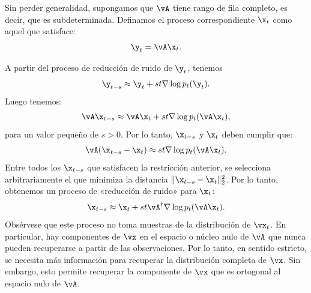 \documentclass[../../book-main_es.tex]{subfiles}
\begin{document}
Sin perder generalidad, supongamos que $\vA$ tiene rango de fila completo,
es decir, que es subdeterminada. Definamos el proceso correspondiente
$\x_t$ como aquel que satisface:
\begin{equation}
    \y_t = \vA \x_t.
\end{equation}

A partir del proceso de reducción de ruido de $\y_t$, tenemos
\begin{equation}
    \y_{t-s} \approx  \y_t + st \nabla \log p_t(\y_t).
\end{equation}
Luego tenemos:
\begin{equation}
    \vA\x_{t-s} \approx   \vA\x_t + st \nabla \log p_t(\vA \x_t),
\end{equation}
para un valor pequeño de $s > 0$. Por lo tanto, $\x_{t-s}$ y $\x_t$ deben cumplir que:
\begin{equation}
    \vA(\x_{t-s} - \x_t) \approx st \nabla \log p_t(\vA\x_t).
\end{equation}
Entre todos los $\x_{t-s}$ que satisfacen la restricción anterior,
se selecciona arbitrariamente el que minimiza la distancia $\|\x_{t-s} -
\x_t\|_2^2$. Por lo tanto, obtenemos un proceso de «reducción de ruido» para $\x_t$:
\begin{equation}
    \x_{t-s}  \approx \x_t + st\vA^\dagger \nabla \log p_t(\vA\x_t).
    \label{eqn:denoising-projection}
\end{equation}
Obsérvese que este proceso no toma muestras de la distribución de
$\vx_t$. En particular, hay componentes de $\vx$ en el espacio o núcleo nulo
de $\vA$ que nunca pueden recuperarse a partir de las observaciones.
Por lo tanto, en sentido estricto, se necesita más información para recuperar la distribución completa de
$\vx$. Sin embargo, esto permite recuperar la componente de $\vx$
que es ortogonal al espacio nulo de $\vA$.
\end{document}
